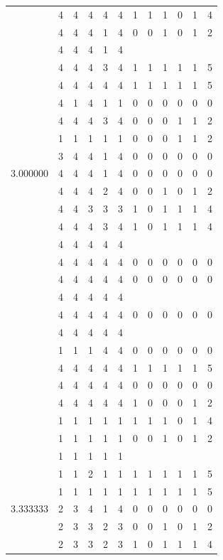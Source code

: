 \documentclass[]{book}
\theoremstyle{definition}
\theoremstyle{definition}
\theoremstyle{definition}
\theoremstyle{remark}
\begin{document}
\begin{table}
{\begin{tabular}[t]{rrrrrrrrrrrr}
 & 4 & 4 & 4 & 4 & 4 & 1 & 1 & 1 & 0 & 1 & 4\\
 & 4 & 4 & 4 & 1 & 4 & 0 & 0 & 1 & 0 & 1 & 2\\
 & 4 & 4 & 4 & 1 & 4 &  &  &  &  &  & \\
 & 4 & 4 & 4 & 3 & 4 & 1 & 1 & 1 & 1 & 1 & 5\\
 & 4 & 4 & 4 & 4 & 4 & 1 & 1 & 1 & 1 & 1 & 5\\
 & 4 & 1 & 4 & 1 & 1 & 0 & 0 & 0 & 0 & 0 & 0\\
 & 4 & 4 & 4 & 3 & 4 & 0 & 0 & 0 & 1 & 1 & 2\\
 & 1 & 1 & 1 & 1 & 1 & 0 & 0 & 0 & 1 & 1 & 2\\
 & 3 & 4 & 4 & 1 & 4 & 0 & 0 & 0 & 0 & 0 & 0\\
3.000000 & 4 & 4 & 4 & 1 & 4 & 0 & 0 & 0 & 0 & 0 & 0\\
 & 4 & 4 & 4 & 2 & 4 & 0 & 0 & 1 & 0 & 1 & 2\\
 & 4 & 4 & 3 & 3 & 3 & 1 & 0 & 1 & 1 & 1 & 4\\
 & 4 & 4 & 4 & 3 & 4 & 1 & 0 & 1 & 1 & 1 & 4\\
 & 4 & 4 & 4 & 4 & 4 &  &  &  &  &  & \\
 & 4 & 4 & 4 & 4 & 4 & 0 & 0 & 0 & 0 & 0 & 0\\
 & 4 & 4 & 4 & 4 & 4 & 0 & 0 & 0 & 0 & 0 & 0\\
 & 4 & 4 & 4 & 4 & 4 &  &  &  &  &  & \\
 & 4 & 4 & 4 & 4 & 4 & 0 & 0 & 0 & 0 & 0 & 0\\
 & 4 & 4 & 4 & 4 & 4 &  &  &  &  &  & \\
 & 1 & 1 & 1 & 4 & 4 & 0 & 0 & 0 & 0 & 0 & 0\\
 & 4 & 4 & 4 & 4 & 4 & 1 & 1 & 1 & 1 & 1 & 5\\
 & 4 & 4 & 4 & 4 & 4 & 0 & 0 & 0 & 0 & 0 & 0\\
 & 4 & 4 & 4 & 4 & 4 & 1 & 0 & 0 & 0 & 1 & 2\\
 & 1 & 1 & 1 & 1 & 1 & 1 & 1 & 1 & 0 & 1 & 4\\
 & 1 & 1 & 1 & 1 & 1 & 0 & 0 & 1 & 0 & 1 & 2\\
 & 1 & 1 & 1 & 1 & 1 &  &  &  &  &  & \\
 & 1 & 1 & 2 & 1 & 1 & 1 & 1 & 1 & 1 & 1 & 5\\
 & 1 & 1 & 1 & 1 & 1 & 1 & 1 & 1 & 1 & 1 & 5\\
3.333333 & 2 & 3 & 4 & 1 & 4 & 0 & 0 & 0 & 0 & 0 & 0\\
 & 2 & 3 & 3 & 2 & 3 & 0 & 0 & 1 & 0 & 1 & 2\\
 & 2 & 3 & 3 & 2 & 3 & 1 & 0 & 1 & 1 & 1 & 4\\

\end{tabular}}
\end{table}
\end{document}
